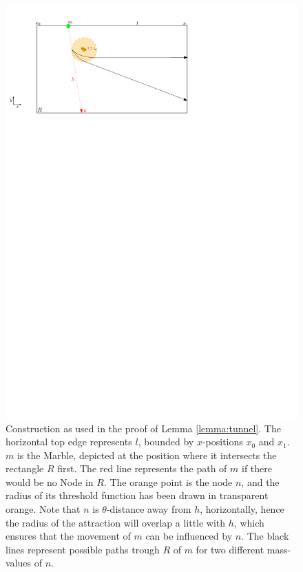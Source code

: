 \begin{figure}[h]
    \centering
    \includegraphics{figures/tunnel_v2.pdf}
    \caption{Construction as used in the proof of Lemma \ref{lemma:tunnel}. The horizontal top edge represents $l$, bounded by $x$-positions $x_0$ and $x_1$. $m$ is the Marble, depicted at the position where it intersects the rectangle $R$ first. The red line represents the path of $m$ if there would be no Node in $R$. The orange point is the node $n$, and the radius of its threshold function has been drawn in transparent orange. Note that $n$ is $\theta$-distance away from $h$, horizontally, hence the radius of the attraction will overlap a little with $h$, which ensures that the movement of $m$ can be influenced by $n$. The black lines represent possible paths trough $R$ of $m$ for two different mass-values of $n$.}
    \label{fig:tunnel}
\end{figure}


